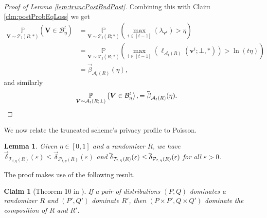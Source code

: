 \documentclass{article}
\theoremstyle{plain}
\newtheorem{lemma}[theorem]{Lemma}
\newtheorem{claim}[theorem]{Claim}
\theoremstyle{definition}
\newcommand{\eps}{\varepsilon}
\newcommand{\lvec}[1]{\reflectbox{$\vec{\reflectbox{$#1$}}$}}
\newcommand{\rand}{R}
\newcommand{\view}{\boldsymbol{v}}
\newcommand{\viewRV}{\boldsymbol{V}}
\newcommand{\prob}[2]{\underset{#1}{\mathbb{P}} \left(#2 \right)}
\newcommand{\lossAlg}[4]{\ell_{#1}\left(#2; #3, #4 \right)}
\newcommand{\Pois}[2]{\mathcal{P}_{#1}\left(#2\right)}
\newcommand{\alloc}[2]{\mathcal{A}_{#1}\left(#2\right)}
\newcommand{\allocFunc}[3]{\mathcal{A}_{#1}\left(#2; #3\right)}
\newcommand{\post}[2]{\mathcal{T}_{#1}\left(#2\right)}
\newcommand{\postFunc}[3]{\mathcal{T}_{#1}\left(#2; #3\right)}
\newcommand{\add}[1]{\lvec{#1}}
\newcommand{\rem}[1]{\vec{#1}}
\newcommand{\privProfAdd}[1]{\add{\delta}_{#1}}
\newcommand{\privProfRem}[1]{\rem{\delta}_{#1}}
\begin{document}
\begin{proof}[Proof of Lemma \ref{lem:truncPostBndPost}]
    Combining this with Claim \ref{clm:postProbEqLoss} we get
    \begin{align*}
        \prob{\viewRV \sim \postFunc{t}{\rand}{*}}{\viewRV \in \mathcal{B}_{\eta}^{t}} & = \prob{\viewRV \sim \postFunc{t}{\rand}{*}}{\underset{i \in [t-1]}{\max} \left(\lambda_{\view^{i}}\right) > \eta} 
        \\& = \prob{\viewRV \sim \postFunc{t}{\rand}{*}}{\underset{i \in [t-1]}{\max} \left(\lossAlg{\alloc{t}{\rand}}{\view^{i}}{\bot}{*} \right) > \ln(t \eta)} 
        \\& = \rem{\beta}_{\alloc{t}{\rand}} (\eta),
    \end{align*}
    and similarly
    \[
        \prob{\viewRV \sim \allocFunc{t}{\rand}{\bot}}{\viewRV \in \mathcal{B}_{\eta}^{t}}, = \add{\beta}_{\alloc{t}{\rand}} (\eta).
    \]
\end{proof}

We now relate the truncated scheme's privacy profile to Poisson.

\begin{lemma} \label{lem:truncBndPois}
    Given $\eta \in [0, 1]$ and a randomizer $\rand$, we have $\privProfRem{\post{t, \eta}{\rand}}(\eps) \le \privProfRem{\Pois{t, \eta}{\rand}}(\eps)$ and $\privProfAdd{\post{t, \eta}{\rand}}(\eps) \le \privProfAdd{\Pois{t, \eta}{\rand}}(\eps)$ for all $\eps > 0$.
\end{lemma}

The proof makes use of the following result.
\begin{claim}[Theorem 10 in \citep{ZDW22}] \label{clm:domPairComp}
    If a pair of distributions $(P, Q)$ dominates a randomizer $\rand$ and $(P', Q')$ dominate $\rand'$, then $(P \times P', Q \times Q')$ dominate the composition of $\rand$ and $\rand'$.
\end{claim}
\end{document}
